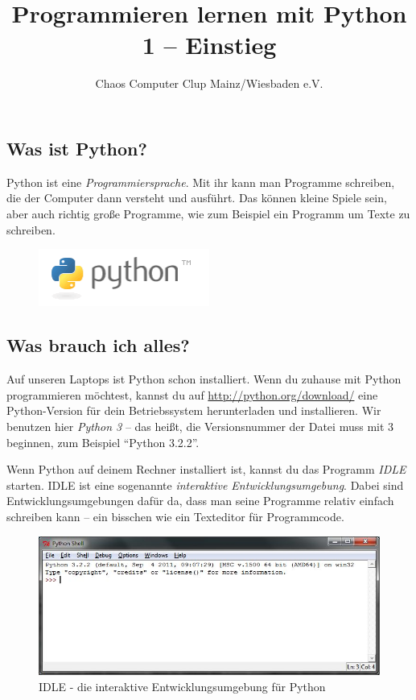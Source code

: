 



	\title{Programmieren lernen mit Python\\1 – Einstieg}
	\author{Chaos Computer Clup Mainz/Wiesbaden e.V.}
	\maketitle
	
	\subsection*{Was ist Python?}
	Python ist eine \emph{Programmiersprache}. Mit ihr kann man Programme schreiben, die der Computer dann versteht und ausführt. Das können kleine Spiele sein, aber auch richtig große Programme, wie zum Beispiel ein Programm um Texte zu schreiben.
	
	\begin{figure}[htbp]
		\centering
		\includegraphics[width=0.5\textwidth]{img/python-logo.png}
	\end{figure}
	
	\subsection*{Was brauch ich alles?}
	Auf unseren Laptops ist Python schon installiert. Wenn du zuhause mit Python programmieren möchtest, kannst du auf \url{http://python.org/download/} eine Python-Version für dein Betriebssystem herunterladen und installieren. Wir benutzen hier \emph{Python 3} – das heißt, die Versionsnummer der Datei muss mit 3 beginnen, zum Beispiel \enquote{Python 3.2.2}.
	
	Wenn Python auf deinem Rechner installiert ist, kannst du das Programm \emph{IDLE} starten. IDLE ist eine sogenannte \emph{interaktive Entwicklungsumgebung}. Dabei sind Entwicklungsumgebungen dafür da, dass man seine Programme relativ einfach schreiben kann – ein bisschen wie ein Texteditor für Programmcode.
	
	\begin{figure}[htbp]
		\centering
		\includegraphics[width=1\textwidth]{img/idle.jpg}
		\caption{IDLE - die interaktive Entwicklungsumgebung für Python}
		\label{IDLE}
	\end{figure}
	
